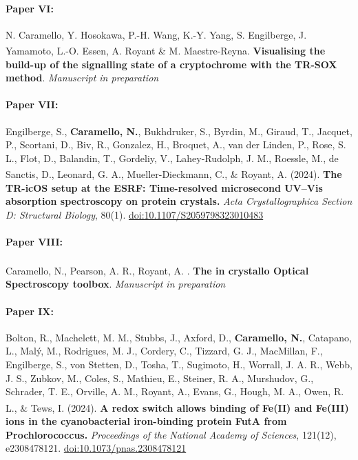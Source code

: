 \documentclass{report}
\begin{document}
\paragraph{Paper VI:} N. Caramello, Y. Hosokawa, P.-H. Wang, K.-Y. Yang, S. Engilberge, J. Yamamoto, L.-O. Essen, A. Royant \& M. Maestre-Reyna.\textsuperscript{\textbf{\textalpha}} \textbf{Visualising the build-up of the signalling state of a cryptochrome with the TR-SOX method}. \textit{Manuscript in preparation}

\paragraph{Paper VII:} Engilberge, S., \textbf{Caramello, N.}, Bukhdruker, S., Byrdin, M., Giraud, T., Jacquet, P., Scortani, D., Biv, R., Gonzalez, H., Broquet, A., van der Linden, P., Rose, S. L., Flot, D., Balandin, T., Gordeliy, V., Lahey-Rudolph, J. M., Roessle, M., de Sanctis, D., Leonard, G. A., Mueller-Dieckmann, C., \& Royant, A.\textsuperscript{\textbf{\textalpha}} (2024). \textbf{The TR-icOS setup at the ESRF: Time-resolved microsecond UV–Vis absorption spectroscopy on protein crystals.} \textit{Acta Crystallographica Section D: Structural Biology}, 80(1). \url{doi:10.1107/S2059798323010483}

\paragraph{Paper VIII:} Caramello, N.\textsuperscript{\textbf{\textalpha}}, Pearson, A. R., Royant, A. \textsuperscript{\textbf{\textalpha}}. \textbf{The in crystallo Optical Spectroscopy toolbox}. \textit{Manuscript in preparation}

\paragraph{Paper IX:} Bolton, R., Machelett, M. M., Stubbs, J., Axford, D., \textbf{Caramello, N.}, Catapano, L., Malý, M., Rodrigues, M. J., Cordery, C., Tizzard, G. J., MacMillan, F., Engilberge, S., von Stetten, D., Tosha, T., Sugimoto, H., Worrall, J. A. R., Webb, J. S., Zubkov, M., Coles, S., Mathieu, E., Steiner, R. A., Murshudov, G., Schrader, T. E., Orville, A. M., Royant, A., Evans, G., Hough, M. A., Owen, R. L., \& Tews, I\textsuperscript{\textbf{\textalpha}}. (2024). \textbf{A redox switch allows binding of Fe(II) and Fe(III) ions in the cyanobacterial iron-binding protein FutA from Prochlorococcus.} \textit{Proceedings of the National Academy of Sciences}, 121(12), e2308478121. \url{doi:10.1073/pnas.2308478121}
\end{document}
